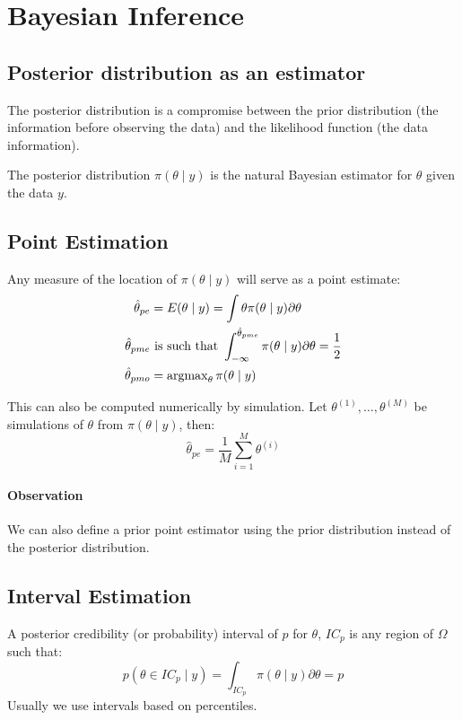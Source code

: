 
\section{Bayesian Inference}

\subsection{Posterior distribution as an estimator}

The posterior distribution is a compromise between the prior
distribution (the information before observing the data) and the
likelihood function (the data information).

The posterior distribution $\pi(\theta \mid y)$ is the natural
Bayesian estimator for $\theta$ given the data $y$.

\subsection{Point Estimation}
Any measure of the location of $\pi(\theta \mid y)$ will serve as a point
estimate:
\begin{align*}
    \hat{\theta}_{pe} &= E(\theta \mid y) = \int \theta \pi(\theta \mid y) \partial\theta \\
    \hat{\theta}_{pme} &\text{ is such that } \int_{-\infty}^{\hat{\theta}_{pme}} \pi(\theta \mid y) \partial\theta = \frac{1}{2} \\
    \hat{\theta}_{pmo} &= \operatorname{argmax}_{\theta} \pi(\theta \mid y) \\
\end{align*}

This can also be computed numerically by simulation. Let $\theta^{(1)}, \dots , \theta^{(M)}$ be
simulations of $\theta$ from $\pi(\theta \mid y)$, then:
\begin{equation}
    \hat{\theta}_{pe} = \frac{1}{M} \sum_{i=1}^M \theta^{(i)}
\end{equation}

\paragraph{Observation} We can also define a prior point estimator using the prior distribution
instead of the posterior distribution.

\subsection{Interval Estimation}
A posterior credibility (or probability) interval of $p$ for $\theta$, $IC_p$ is
any region of $\Omega$ such that:
\begin{equation}
    p(\theta \in IC_p \mid y) = \int_{IC_p} \pi(\theta \mid y) \partial\theta = p
\end{equation}
Usually we use intervals based on percentiles.
